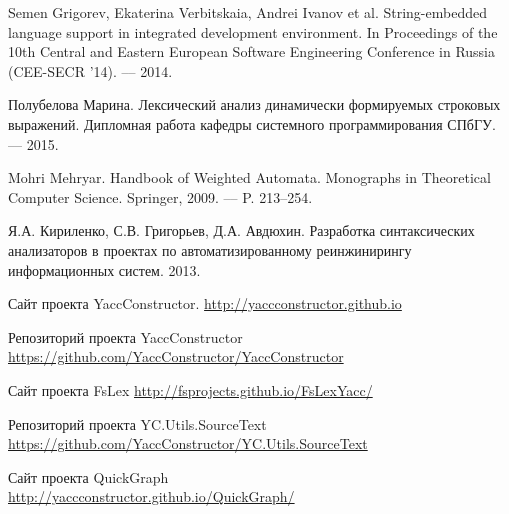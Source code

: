 \begin{thebibliography}{99}

  Semen Grigorev, Ekaterina Verbitskaia, Andrei Ivanov et al.
  String-embedded language support in integrated development environment.
  In Proceedings of the 10th Central and Eastern European Software Engineering Conference in Russia (CEE-SECR ’14). –– 2014.

  Полубелова Марина.
  Лексический анализ динамически формируемых строковых выражений.
  Дипломная работа кафедры системного программирования СПбГУ. –– 2015.

  Mohri Mehryar. 
  Handbook of Weighted Automata.
  Monographs in Theoretical Computer Science. Springer, 2009. –– P. 213–254. 

  Я.А. Кириленко, С.В. Григорьев, Д.А. Авдюхин. 
  Разработка синтаксических анализаторов в проектах по автоматизированному реинжинирингу информационных систем. 
  2013. 

  Сайт проекта YaccConstructor.
  \url{http://yaccconstructor.github.io}

  Репозиторий проекта YaccConstructor
  \url{https://github.com/YaccConstructor/YaccConstructor}

  Сайт проекта FsLex
  \url{http://fsprojects.github.io/FsLexYacc/}

  Репозиторий проекта YC.Utils.SourceText
  \url{https://github.com/YaccConstructor/YC.Utils.SourceText}

  Сайт проекта QuickGraph~\\
  \url{http://yaccconstructor.github.io/QuickGraph/}

\end{thebibliography}


